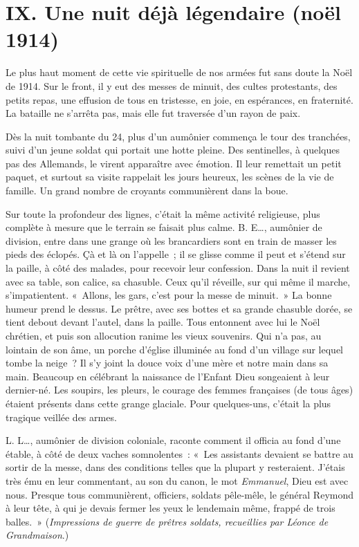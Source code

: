 \documentclass[french,twoside]{book} %
\newcommand\chapteropen{} %
\newcommand\chaptercont{} %
\begin{document}
\chapteropen
\chapter[{IX. Une nuit déjà légendaire (noël 1914)‌}]{IX. Une nuit déjà légendaire (noël 1914)‌}\renewcommand{\leftmark}{IX. Une nuit déjà légendaire (noël 1914)‌}


\chaptercont
\noindent Le plus haut moment de cette vie spirituelle de nos armées fut sans doute la Noël de 1914. Sur le front, il y eut des messes de minuit, des cultes protestants, des petits repas, une effusion de tous en tristesse, en joie, en espérances, en fraternité. La bataille ne s’arrêta pas, mais elle fut traversée d’un rayon de paix.‌\par
Dès la nuit tombante du 24, plus d’un aumônier commença le tour des tranchées, suivi d’un jeune soldat qui portait une hotte pleine. Des sentinelles, à quelques pas des Allemands, le virent apparaître avec émotion. Il leur remettait un petit paquet, et surtout sa visite rappelait les jours heureux, les scènes de la vie de famille. Un grand nombre de croyants communièrent dans la boue.‌\par
Sur toute la profondeur des lignes, c’était la même activité religieuse, plus complète à mesure que le terrain se faisait plus calme. B. E…, aumônier de division, entre dans une grange où les brancardiers sont en train de masser les pieds des éclopés. Çà et là on l’appelle ; il se glisse comme il peut et s’étend sur la paille, à côté des malades, pour recevoir leur confession. Dans la nuit il revient avec sa table, son calice, sa chasuble. Ceux qu’il réveille, sur qui même il marche, s’impatientent. « Allons, les gars, c’est pour la messe de minuit. » La bonne humeur prend le dessus. Le prêtre, avec ses bottes et sa grande chasuble dorée, se tient debout devant l’autel, dans la paille. Tous entonnent avec lui le Noël chrétien, et puis son allocution ranime les vieux souvenirs. Qui n’a pas, au lointain de son âme, un porche d’église illuminée au fond d’un village sur lequel tombe la neige ? Il s’y joint la douce voix d’une mère et notre main dans sa main. Beaucoup en célébrant la naissance de l’Enfant Dieu songeaient à leur dernier-né. Les soupirs, les pleurs, le courage des femmes françaises (de tous âges) étaient présents dans cette grange glaciale. Pour quelques-uns, c’était la plus tragique veillée des armes.‌\par
L. L…, aumônier de division coloniale, raconte comment il officia au fond d’une étable, à côté de deux vaches somnolentes : « Les assistants devaient se battre au sortir de la messe, dans des conditions telles que la plupart y resteraient. J’étais très ému en leur commentant, au son du canon, le mot {\itshape Emmanuel}, Dieu est avec nous. Presque tous communièrent, officiers, soldats pêle-mêle, le général Reymond à leur tête, à qui je devais fermer les yeux le lendemain même, frappé de trois balles. » ({\itshape Impressions de guerre de prêtres soldats, recueillies par Léonce de Grandmaison}.)‌\par
\end{document}
